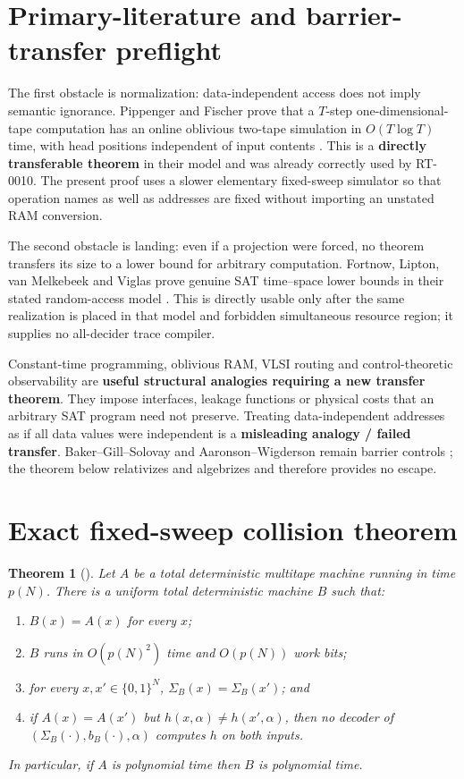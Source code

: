 \documentclass[11pt]{article}
\newtheorem{theorem}{Theorem}
\newcommand{\claim}[1]{\texttt{\detokenize{#1}}}
\begin{document}
\section{Primary-literature and barrier-transfer preflight}
The first obstacle is normalization: data-independent access does not imply
semantic ignorance.  Pippenger and Fischer prove that a $T$-step
one-dimensional-tape computation has an online oblivious two-tape simulation
in $O(T\log T)$ time, with head positions independent of input contents
\cite{PF79}.  This is a \textbf{directly transferable theorem} in their model
and was already correctly used by RT-0010.  The present proof uses a slower
elementary fixed-sweep simulator so that operation names as well as addresses
are fixed without importing an unstated RAM conversion.

The second obstacle is landing: even if a projection were forced, no theorem
transfers its size to a lower bound for arbitrary computation.  Fortnow,
Lipton, van Melkebeek and Viglas prove genuine SAT time--space lower bounds in
their stated random-access model \cite{FLMV05}.  This is directly usable only
after the same realization is placed in that model and forbidden simultaneous
resource region; it supplies no all-decider trace compiler.

Constant-time programming, oblivious RAM, VLSI routing and control-theoretic
observability are \textbf{useful structural analogies requiring a new transfer
theorem}.  They impose interfaces, leakage functions or physical costs that
an arbitrary SAT program need not preserve.  Treating data-independent
addresses as if all data values were independent is a \textbf{misleading
analogy / failed transfer}.  Baker--Gill--Solovay and
Aaronson--Wigderson remain barrier controls \cite{BGS75,AW09}; the theorem
below relativizes and algebrizes and therefore provides no escape.

\section{Exact fixed-sweep collision theorem}
\begin{theorem}[\claim{SCHEDULE-DECISION-COMPATIBILITY-COLLISION1}]
Let $A$ be a total deterministic multitape machine running in time $p(N)$.
There is a uniform total deterministic machine $B$ such that:
\begin{enumerate}[label=(\roman*)]
\item $B(x)=A(x)$ for every $x$;
\item $B$ runs in $O(p(N)^2)$ time and $O(p(N))$ work bits;
\item for every $x,x'\in\{0,1\}^N$, $\Sigma_B(x)=\Sigma_B(x')$; and
\item if $A(x)=A(x')$ but $h(x,\alpha)\ne h(x',\alpha)$, then no decoder of
$(\Sigma_B(\cdot),b_B(\cdot),\alpha)$ computes $h$ on both inputs.
\end{enumerate}
In particular, if $A$ is polynomial time then $B$ is polynomial time.
\end{theorem}
\end{document}
